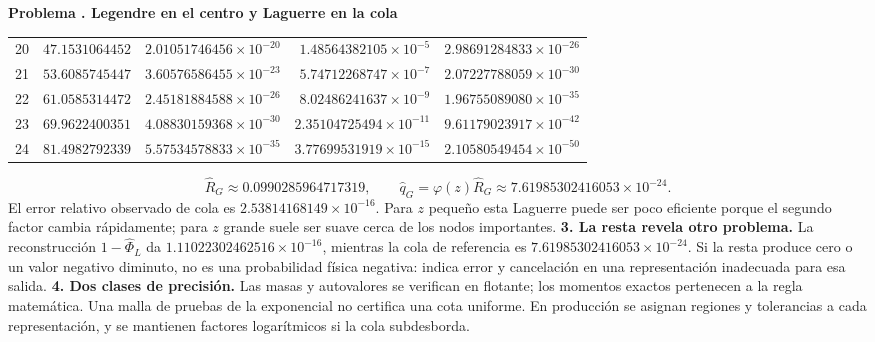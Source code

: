 \documentclass[11pt,a4paper]{article}
\theoremstyle{definition}
\newcounter{problema}
\newenvironment{resuelto}[1]{\refstepcounter{problema}\par\medskip\Needspace{6\baselineskip}\textbf{Problema \theproblema. #1}\par}{\par\medskip}
\begin{document}
\begin{resuelto}{Legendre en el centro y Laguerre en la cola}
\begin{center}
\begin{tabular}{rrrrr}
20&$47.1531064452$&$2.01051746456\times10^{-20}$&$1.48564382105\times10^{-5}$&$2.98691284833\times10^{-26}$\\
21&$53.6085745447$&$3.60576586455\times10^{-23}$&$5.74712268747\times10^{-7}$&$2.07227788059\times10^{-30}$\\
22&$61.0585314472$&$2.45181884588\times10^{-26}$&$8.02486241637\times10^{-9}$&$1.96755089080\times10^{-35}$\\
23&$69.9622400351$&$4.08830159368\times10^{-30}$&$2.35104725494\times10^{-11}$&$9.61179023917\times10^{-42}$\\
24&$81.4982792339$&$5.57534578833\times10^{-35}$&$3.77699531919\times10^{-15}$&$2.10580549454\times10^{-50}$\\
\bottomrule\end{tabular}\end{center}
\[
\widehat R_G\approx0.0990285964717319,\qquad
\widehat q_G=\varphi(z)\widehat R_G\approx7.61985302416053\times10^{-24}.
\]
El error relativo observado de cola es $2.53814168149\times10^{-16}$. Para $z$ pequeño esta Laguerre puede ser poco eficiente porque el segundo factor cambia rápidamente; para $z$ grande suele ser suave cerca de los nodos importantes.
\textbf{3. La resta revela otro problema.} La reconstrucción $1-\widehat\Phi_L$ da $1.11022302462516\times10^{-16}$, mientras la cola de referencia es $7.61985302416053\times10^{-24}$. Si la resta produce cero o un valor negativo diminuto, no es una probabilidad física negativa: indica error y cancelación en una representación inadecuada para esa salida.
\textbf{4. Dos clases de precisión.} Las masas y autovalores se verifican en flotante; los momentos exactos pertenecen a la regla matemática. Una malla de pruebas de la exponencial no certifica una cota uniforme. En producción se asignan regiones y tolerancias a cada representación, y se mantienen factores logarítmicos si la cola subdesborda.
\end{resuelto}
\end{document}
